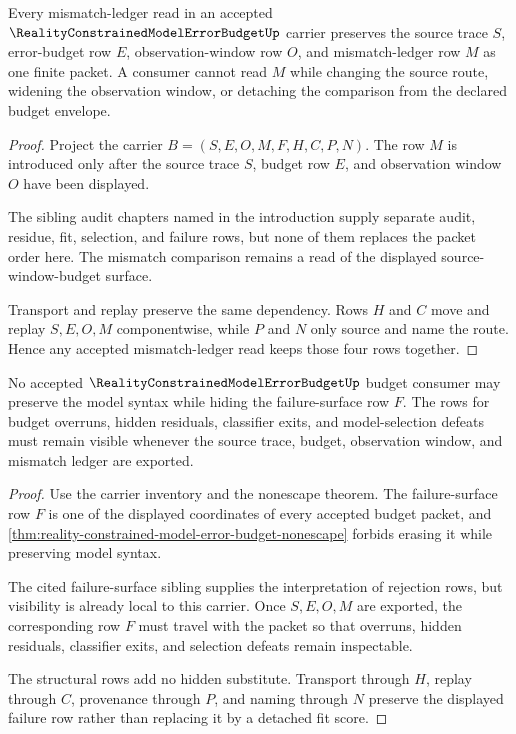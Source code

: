 \begin{theorem}
\label{thm:reality-constrained-model-error-budget-window-exactness}
Every mismatch-ledger read in an accepted $\RealityConstrainedModelErrorBudgetUp$ carrier preserves the source trace $S$, error-budget row $E$, observation-window row $O$, and mismatch-ledger row $M$ as one finite packet. A consumer cannot read $M$ while changing the source route, widening the observation window, or detaching the comparison from the declared budget envelope.
\end{theorem}
\begin{proof}
Project the carrier $B=(S,E,O,M,F,H,C,P,N)$. The row $M$ is introduced only after the source trace $S$, budget row $E$, and observation window $O$ have been displayed.

The sibling audit chapters named in the introduction supply separate audit, residue, fit, selection, and failure rows, but none of them replaces the packet order here. The mismatch comparison remains a read of the displayed source-window-budget surface.

Transport and replay preserve the same dependency. Rows $H$ and $C$ move and replay $S,E,O,M$ componentwise, while $P$ and $N$ only source and name the route. Hence any accepted mismatch-ledger read keeps those four rows together.
\end{proof}

\begin{theorem}
\label{thm:reality-constrained-model-error-budget-failure-visibility}
No accepted $\RealityConstrainedModelErrorBudgetUp$ budget consumer may preserve the model syntax while hiding the failure-surface row $F$. The rows for budget overruns, hidden residuals, classifier exits, and model-selection defeats must remain visible whenever the source trace, budget, observation window, and mismatch ledger are exported.
\end{theorem}
\begin{proof}
Use the carrier inventory and the nonescape theorem. The failure-surface row $F$ is one of the displayed coordinates of every accepted budget packet, and \autoref{thm:reality-constrained-model-error-budget-nonescape} forbids erasing it while preserving model syntax.

The cited failure-surface sibling supplies the interpretation of rejection rows, but visibility is already local to this carrier. Once $S,E,O,M$ are exported, the corresponding row $F$ must travel with the packet so that overruns, hidden residuals, classifier exits, and selection defeats remain inspectable.

The structural rows add no hidden substitute. Transport through $H$, replay through $C$, provenance through $P$, and naming through $N$ preserve the displayed failure row rather than replacing it by a detached fit score.
\end{proof}

